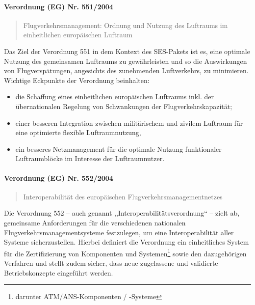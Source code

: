 \paragraph{Verordnung (EG) Nr. 551/2004} \label{er_551}
\begin{quote}
    Flugverkehrsmanagement: Ordnung und Nutzung des Luftraums im einheitlichen europäischen Luftraum  \cite{2004R0551, 2004R0551_summary}
\end{quote}
Das Ziel der Verordnung 551 in dem Kontext des SES-Pakets ist es, eine optimale Nutzung des gemeinsamen Luftraums zu gewährleisten und so die Auswirkungen von Flugverspätungen, angesichts des zunehmenden Luftverkehrs, zu minimieren. 
Wichtige Eckpunkte der Verordnung beinhalten: 
    \begin{itemize}
        \item die Schaffung eines einheitlichen europäischen Luftraums inkl. der übernationalen Regelung von Schwankungen der Flugverkehrskapazität;
        \item  einer besseren Integration zwischen militärischem und zivilem Luftraum für eine optimierte flexible Luftraumnutzung,
        \item ein besseres Netzmanagement für die optimale Nutzung funktionaler Luftraumblöcke im Interesse der Luftraumnutzer. \cite{2004R0551_summary}
    \end{itemize}

\pagebreak

\paragraph{Verordnung (EG) Nr. 552/2004} \label{er_552}

\begin{quote}
    Interoperabilität des europäischen Flugverkehrsmanagement\-netzes\cite{2004R0552, 2004R0552_summary}
\end{quote}
Die Verordnung 552 -- auch genannt ,,Interoperabilitätsverordnung`` -- zielt ab, gemeinsame Anforderungen für die verschiedenen nationalen Flugverkehrsmanagementsysteme festzulegen, um eine Interoperabilität aller Systeme sicherzustellen. \cite{2004R0552_summary}
Hierbei definiert die Verordnung ein einheitliches System für die Zertifizierung von Komponenten und Systemen\footnote{darunter ATM/ANS-Komponenten / -Systeme} sowie den dazugehörigen Verfahren und stellt zudem sicher, dass neue zugelassene und validierte Betriebskonzepte eingeführt werden. \cite[Art. 3 Abs. 1]{2004R0552}

